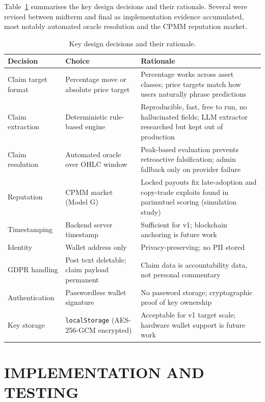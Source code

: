\documentclass[a4paper,12pt]{report}
\begin{document}
Table~\ref{table:design_decisions} summarises the key design decisions and their rationale. Several were revised between midterm and final as implementation evidence accumulated, most notably automated oracle resolution and the CPMM reputation market.

\begin{table}[H]
\caption[Design Decisions]{Key design decisions and their rationale.}
\begin{center}
\footnotesize
\begin{tabular}{|p{3.2cm}|p{3.4cm}|p{5.8cm}|}
\hline
\textbf{Decision} & \textbf{Choice} & \textbf{Rationale} \\\hline
Claim target format & Percentage move or absolute price target & Percentage works across asset classes; price targets match how users naturally phrase predictions \\\hline
Claim extraction & Deterministic rule-based engine & Reproducible, fast, free to run, no hallucinated fields; LLM extractor researched but kept out of production \\\hline
Claim resolution & Automated oracle over OHLC window & Peak-based evaluation prevents retroactive falsification; admin fallback only on provider failure \\\hline
Reputation & CPMM market (Model G) & Locked payouts fix late-adoption and copy-trade exploits found in parimutuel scoring (simulation study) \\\hline
Timestamping & Backend server timestamp & Sufficient for v1; blockchain anchoring is future work \\\hline
Identity & Wallet address only & Privacy-preserving; no PII stored \\\hline
GDPR handling & Post text deletable; claim payload permanent & Claim data is accountability data, not personal commentary \\\hline
Authentication & Passwordless wallet signature & No password storage; cryptographic proof of key ownership \\\hline
Key storage & \texttt{localStorage} (AES-256-GCM encrypted) & Acceptable for v1 target scale; hardware wallet support is future work \\\hline
\end{tabular}
\label{table:design_decisions}
\end{center}
\end{table}

\chapter{IMPLEMENTATION AND TESTING}
\end{document}
